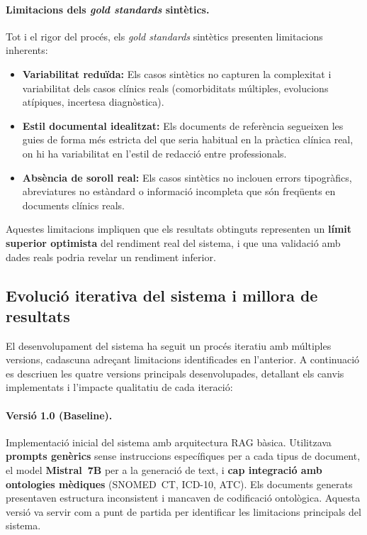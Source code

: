 \documentclass[CAT]{TFUOC}%
\begin{document}
\paragraph{Limitacions dels \textit{gold standards} sintètics.}
Tot i el rigor del procés, els \textit{gold standards} sintètics presenten limitacions inherents:
\begin{itemize}
    \item \textbf{Variabilitat reduïda:} Els casos sintètics no capturen la complexitat i variabilitat dels casos clínics reals (comorbiditats múltiples, evolucions atípiques, incertesa diagnòstica).
    \item \textbf{Estil documental idealitzat:} Els documents de referència segueixen les guies de forma més estricta del que seria habitual en la pràctica clínica real, on hi ha variabilitat en l'estil de redacció entre professionals.
    \item \textbf{Absència de soroll real:} Els casos sintètics no inclouen errors tipogràfics, abreviatures no estàndard o informació incompleta que són freqüents en documents clínics reals.
\end{itemize}

Aquestes limitacions impliquen que els resultats obtinguts representen un \textbf{límit superior optimista} del rendiment real del sistema, i que una validació amb dades reals podria revelar un rendiment inferior.

\subsection{Evolució iterativa del sistema i millora de resultats}

El desenvolupament del sistema ha seguit un procés iteratiu amb múltiples versions, cadascuna adreçant limitacions identificades en l'anterior. A continuació es descriuen les quatre versions principals desenvolupades, detallant els canvis implementats i l'impacte qualitatiu de cada iteració:

\paragraph{Versió 1.0 (Baseline).}
Implementació inicial del sistema amb arquitectura RAG bàsica. Utilitzava \textbf{prompts genèrics} sense instruccions específiques per a cada tipus de document, el model \textbf{Mistral~7B} per a la generació de text, i \textbf{cap integració amb ontologies mèdiques} (SNOMED~CT, ICD-10, ATC). Els documents generats presentaven estructura inconsistent i mancaven de codificació ontològica. Aquesta versió va servir com a punt de partida per identificar les limitacions principals del sistema.
\end{document}
